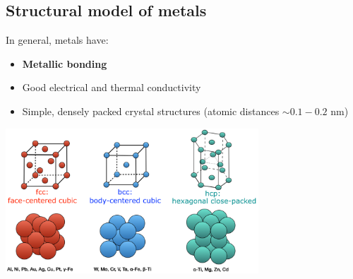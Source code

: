 \documentclass{article}
\begin{document}
\subsection{Structural model of metals}
In general, metals have:
\begin{itemize}
  \item \textbf{Metallic bonding}
  \item Good electrical and thermal conductivity
  \item Simple, densely packed crystal structures (atomic distances $\sim 0.1-0.2$ nm)
\end{itemize}

\begin{center}
  \includegraphics[width=0.71\textwidth]{media/fccbcchcp.png}
\end{center}
\end{document}
